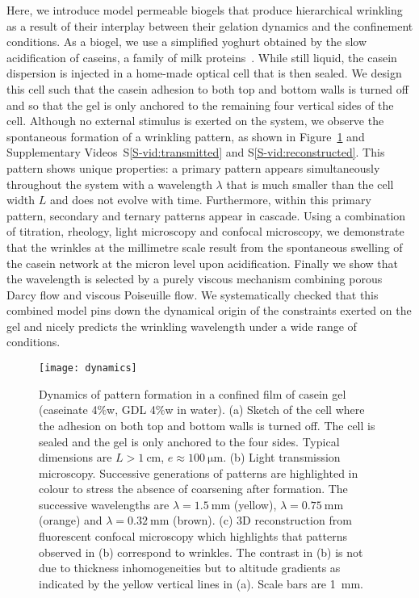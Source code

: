 \documentclass[twocolumn,superscriptaddress,showpacs,preprintnumbers, amsmath,amssymb,prl]{revtex4-1}
\begin{document}
Here, we introduce model permeable biogels that produce hierarchical wrinkling as a result of their interplay between their gelation dynamics and the confinement conditions. 
As a biogel, we use a simplified yoghurt obtained by the slow acidification of caseins, a family of milk proteins~\cite{Roefs1986,Bremer1989,Lucey1998,Dickinson2002}. While still liquid, the casein dispersion is injected in a home-made optical cell that is then sealed. We design this cell such that the casein adhesion to both top and bottom walls is turned off and so that the gel is only anchored to the remaining four vertical sides of the cell.
%
Although no external stimulus is exerted on the system, we observe the spontaneous formation of a wrinkling pattern, as shown in Figure~\ref{fig:dynamics} and Supplementary Videos~S\ref{S-vid:transmitted} and S\ref{S-vid:reconstructed}. This pattern shows unique properties: a primary pattern appears simultaneously throughout the system with a wavelength $\lambda$ that is much smaller than the cell width $L$ and does not evolve with time. Furthermore, within this primary pattern, secondary and ternary patterns appear in cascade.
Using a combination of titration, rheology, light microscopy and confocal microscopy, we demonstrate that the wrinkles at the millimetre scale result from the spontaneous swelling of the casein network at the micron level upon acidification.
%
Finally we show that the wavelength is selected by a purely viscous mechanism combining porous Darcy flow and viscous Poiseuille flow. We systematically checked that this combined model pins down the dynamical origin of the constraints exerted on the gel and nicely predicts the wrinkling wavelength under a wide range of conditions.


\begin{figure}
	\texttt{[image: dynamics]}%
	\caption{Dynamics of pattern formation in a confined film of casein gel (caseinate 4\%w, GDL 4\%w in water). (a) Sketch of the cell where the adhesion on both top and bottom walls is turned off. The cell is sealed and the gel is only anchored to the four sides. Typical dimensions are $L>\SI{1}{\centi\metre}$, $e\approx\SI{100}{\micro\metre}$. (b) Light transmission microscopy. Successive generations of patterns are highlighted in colour to stress the absence of coarsening after formation. The successive wavelengths are $\lambda=\SI{1.5}{\milli\metre}$ (yellow), $\lambda=\SI{0.75}{\milli\metre}$ (orange) and $\lambda=\SI{0.32}{\milli\metre}$ (brown). (c) 3D reconstruction from fluorescent confocal microscopy which highlights that patterns observed in (b) correspond to wrinkles. The contrast in (b) is not due to thickness inhomogeneities but to altitude gradients as indicated by the yellow vertical lines in (a). Scale bars are \SI{1}{\milli\metre}.}%
	\label{fig:dynamics}%
\end{figure}
\end{document}
